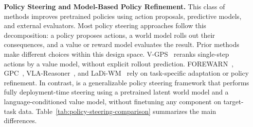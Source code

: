 \textbf{Policy Steering and Model-Based Policy Refinement.}
This class of methods improves pretrained policies using action proposals, predictive models, and external evaluators. Most policy steering approaches follow this decomposition: a policy proposes actions, a world model rolls out their consequences, and a value or reward model evaluates the result. 
Prior methods make different choices within this design space. V-GPS~\citep{nakamoto2024steering} reranks single-step actions by a value model, without explicit rollout prediction. FOREWARN~\citep{wu2025foresight}, GPC~\citep{qi2025strengthening}, VLA-Reasoner~\citep{guo2025vla}, and LaDi-WM~\citep{huang2025ladi} rely on task-specific adaptation or policy refinement. In contrast, \coolname{} is a generalizable policy steering framework that performs fully deployment-time steering using a pretrained latent world model and a language-conditioned value model, without finetuning any component on target-task data. Table~\ref{tab:policy-steering-comparison} summarizes the main differences.

